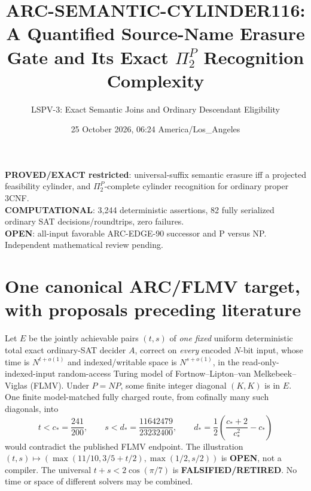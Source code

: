 \documentclass[11pt]{article}
\title{ARC-SEMANTIC-CYLINDER116:\\
A Quantified Source-Name Erasure Gate and Its Exact \(\Pi_2^P\) Recognition Complexity}
\author{LSPV-3: Exact Semantic Joins and Ordinary Descendant Eligibility}
\date{25 October 2026, 06:24 America/Los\_Angeles}
\begin{document}
\maketitle
\begin{center}
\textbf{PROVED/EXACT restricted}: universal-suffix semantic erasure iff a projected feasibility cylinder, and \(\Pi_2^P\)-complete cylinder recognition for ordinary proper 3CNF.\\
\textbf{COMPUTATIONAL}: 3,244 deterministic assertions, 82 fully serialized ordinary SAT decisions/roundtrips, zero failures.\\
\textbf{OPEN}: all-input favorable ARC-EDGE-90 successor and P versus NP. Independent mathematical review pending.
\end{center}

\section{One canonical ARC/FLMV target, with proposals preceding literature}
Let \(E\) be the jointly achievable pairs \((t,s)\) of \emph{one fixed} uniform deterministic total exact ordinary-SAT decider \(A\), correct on \emph{every} encoded \(N\)-bit input, whose time is \(N^{t+o(1)}\) and indexed/writable space is \(N^{s+o(1)}\), in the read-only-indexed-input random-access Turing model of Fortnow--Lipton--van Melkebeek--Viglas (FLMV). Under \(P=NP\), some finite integer diagonal \((K,K)\) is in \(E\). One finite model-matched fully charged route, from cofinally many such diagonals, into
\[
 t< c_*=\frac{241}{200},\qquad
 s< d_*=\frac{11642479}{23232400},\qquad
 d_*=\frac12\left(\frac{c_*+2}{c_*^2}-c_*\right)
\]
would contradict the published FLMV endpoint. The illustration
\((t,s)\mapsto(\max(11/10,3/5+t/2),\max(1/2,s/2))\) is \textbf{OPEN}, not a compiler. The universal \(t+s<2\cos(\pi/7)\) is \textbf{FALSIFIED/RETIRED}. No time or space of different solvers may be combined.
\end{document}

